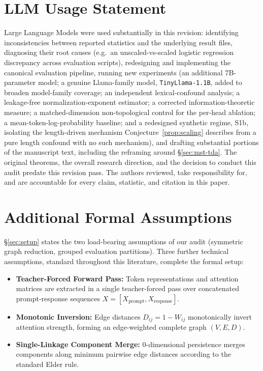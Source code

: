\documentclass{article}
\begin{document}
\section*{LLM Usage Statement}
Large Language Models were used substantially in this revision: identifying inconsistencies between reported statistics and the underlying result files, diagnosing their root causes (e.g.\ an unscaled-vs-scaled logistic regression discrepancy across evaluation scripts), redesigning and implementing the canonical evaluation pipeline, running new experiments (an additional 7B-parameter model; a genuine Llama-family model, \texttt{TinyLlama-1.1B}, added to broaden model-family coverage; an independent lexical-confound analysis; a leakage-free normalization-exponent estimator; a corrected information-theoretic measure; a matched-dimension non-topological control for the per-head ablation; a mean-token-log-probability baseline; and a redesigned synthetic regime, S1b, isolating the length-driven mechanism Conjecture~\ref{prop:scaling} describes from a pure length confound with no such mechanism), and drafting substantial portions of the manuscript text, including the reframing around \S\ref{sec:mst-tda}. The original theorems, the overall research direction, and the decision to conduct this audit predate this revision pass. The authors reviewed, take responsibility for, and are accountable for every claim, statistic, and citation in this paper.




\newpage
\appendix

\section{Additional Formal Assumptions}
\label{app:assumptions}
\S\ref{sec:setup} states the two load-bearing assumptions of our audit (symmetric graph reduction, grouped evaluation partitions). Three further technical assumptions, standard throughout this literature, complete the formal setup:
\begin{itemize}
    \item \textbf{Teacher-Forced Forward Pass:} Token representations and attention matrices are extracted in a single teacher-forced pass over concatenated prompt-response sequences $X = [X_{\text{prompt}}, X_{\text{response}}]$.
    \item \textbf{Monotonic Inversion:} Edge distances $D_{ij} = 1 - W_{ij}$ monotonically invert attention strength, forming an edge-weighted complete graph $(V, E, D)$.
    \item \textbf{Single-Linkage Component Merge:} $0$-dimensional persistence merges components along minimum pairwise edge distances according to the standard Elder rule.
\end{itemize}
\end{document}

